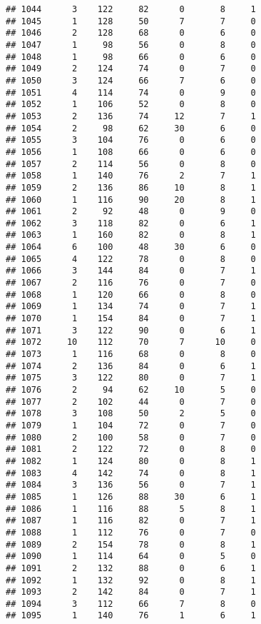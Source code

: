 \documentclass[
]{article}
\begin{document}
\begin{verbatim}
## 1044      3    122     82      0       8     1
## 1045      1    128     50      7       7     0
## 1046      2    128     68      0       6     0
## 1047      1     98     56      0       8     0
## 1048      1     98     66      0       6     0
## 1049      2    124     74      0       7     0
## 1050      3    124     66      7       6     0
## 1051      4    114     74      0       9     0
## 1052      1    106     52      0       8     0
## 1053      2    136     74     12       7     1
## 1054      2     98     62     30       6     0
## 1055      3    104     76      0       6     0
## 1056      1    108     66      0       6     0
## 1057      2    114     56      0       8     0
## 1058      1    140     76      2       7     1
## 1059      2    136     86     10       8     1
## 1060      1    116     90     20       8     1
## 1061      2     92     48      0       9     0
## 1062      3    118     82      0       6     1
## 1063      1    160     82      0       8     1
## 1064      6    100     48     30       6     0
## 1065      4    122     78      0       8     0
## 1066      3    144     84      0       7     1
## 1067      2    116     76      0       7     0
## 1068      1    120     66      0       8     0
## 1069      1    134     74      0       7     1
## 1070      1    154     84      0       7     1
## 1071      3    122     90      0       6     1
## 1072     10    112     70      7      10     0
## 1073      1    116     68      0       8     0
## 1074      2    136     84      0       6     1
## 1075      3    122     80      0       7     1
## 1076      2     94     62     10       5     0
## 1077      2    102     44      0       7     0
## 1078      3    108     50      2       5     0
## 1079      1    104     72      0       7     0
## 1080      2    100     58      0       7     0
## 1081      2    122     72      0       8     0
## 1082      1    124     80      0       8     1
## 1083      4    142     74      0       8     1
## 1084      3    136     56      0       7     1
## 1085      1    126     88     30       6     1
## 1086      1    116     88      5       8     1
## 1087      1    116     82      0       7     1
## 1088      1    112     76      0       7     0
## 1089      2    154     78      0       8     1
## 1090      1    114     64      0       5     0
## 1091      2    132     88      0       6     1
## 1092      1    132     92      0       8     1
## 1093      2    142     84      0       7     1
## 1094      3    112     66      7       8     0
## 1095      1    140     76      1       6     1

\end{verbatim}
\end{document}
